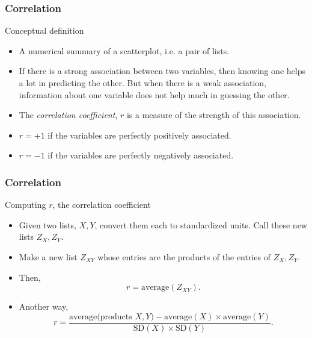 \documentclass[handout]{beamer}
\begin{document}

   \begin{frame} \frametitle{Correlation}

   \begin{block}
   {Conceptual definition}

   \begin{itemize}
   \item A numerical summary of a scatterplot, i.e. a pair of lists.

   \item    If there is a strong association between two variables, then
   knowing one helps a lot in predicting the other. But when
   there is a weak association, information about one variable
   does not help much in guessing the other.

   \item The {\em correlation coefficient}, $r$ is a measure of the strength of this association.

   \item $r=+1$ if the variables are perfectly positively associated.

   \item $r=-1$ if the variables are perfectly negatively associated.
   \end{itemize}
   \end{block}
   \end{frame}


   \begin{frame} \frametitle{Correlation}

   \begin{block}
   {Computing $r$, the correlation coefficient}

   \begin{itemize}
   \item Given two lists, $X, Y$, convert them
   each to standardized units. Call these new lists $Z_X, Z_Y$.

   \item Make a new list $Z_{XY}$ whose entries are the products
   of the entries of $Z_X, Z_Y$.
   \item Then,
   $$
   r = \text{average}(Z_{XY}).
   $$
   \item Another way,
   $$
   r = \frac{\text{average(products $X, Y$)} - \text{average}(X) \times \text{average}(Y)}{\text{SD}(X) \times \text{SD}(Y)}.
   $$
   \end{itemize}
   \end{block}
   \end{frame}
\end{document}
